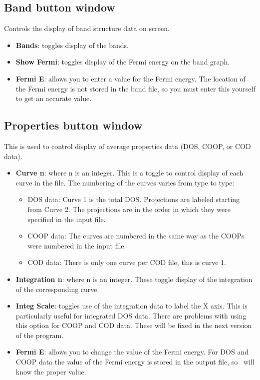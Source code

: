 \subsection{Band button window}

Controls the display of band structure data on screen.

\begin{itemize}
\item {\bf Bands}: toggles display of the bands.

\item {\bf Show Fermi}: toggles display of the Fermi energy on the
band graph.

\item {\bf Fermi E}: allows you to enter a value for the Fermi energy.
The location of the Fermi energy is not stored in the band file, so
you must enter this yourself to get an accurate value.
\end{itemize}

\subsection{Properties button window}

This is used to control display of average properties data (DOS, COOP,
or COD data).  

\begin{itemize}
\item {\bf Curve n}: where n is an integer.  This is a toggle to
control display of each curve in the file.  The numbering of the
curves varies from type to type:  
\begin{itemize}
\item DOS data:  Curve 1 is the total DOS.  Projections are
labeled starting from Curve 2.  The projections are in the order in
which they were specified in the input file.

\item COOP data: The curves are numbered in the same way as the COOPs
were numbered in the input file.

\item COD data: There is only one curve per COD file, this is curve 1.
\end{itemize}

\item {\bf Integration n}: where n is an integer.  These toggle
display of
the integration of the corresponding curve.

\item {\bf Integ Scale}: toggles use of the integration data to label
the X axis.  This is particularly useful for integrated DOS data.
There are problems with using this option for COOP and COD data.
These will be fixed in the next version of the program.

\item {\bf Fermi E}: allows you to change the value of the Fermi energy.
For DOS and COOP data the value of the Fermi energy is stored in
the output file, so \viewprog\ will know the proper value.  

\end{itemize}


